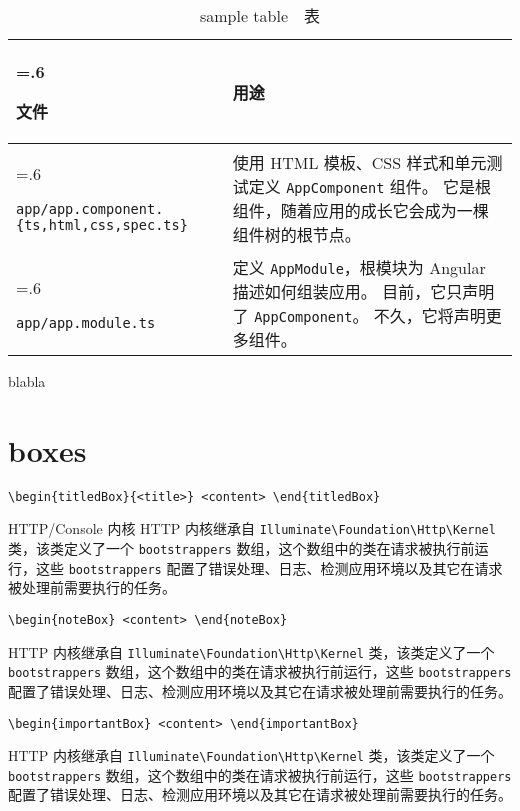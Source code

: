 \documentclass{codedump}
\begin{document}
\noindent
\begin{table}[htp]
  \caption{sample table　表 }\label{table:1}
  \begin{tabularx}{\textwidth}{>{\hsize=.6\hsize\raggedright\arraybackslash}X>{\raggedright\arraybackslash}X}\toprule
    \bfseries{文件} & \bfseries{用途}\\ \midrule
    \verb|app/app.component.{ts,html,css,spec.ts}| & 使用 HTML 模板、CSS 样式和单元测试定义 \verb|AppComponent| 组件。 它是根组件，随着应用的成长它会成为一棵组件树的根节点。\\
    \verb|app/app.module.ts| & 定义 \verb|AppModule|，根模块为 Angular 描述如何组装应用。 目前，它只声明了 \verb|AppComponent|。 不久，它将声明更多组件。\\ \bottomrule
  \end{tabularx}
\end{table}
blabla

\clearpage

\section{boxes}

\noindent\verb|\begin{titledBox}{<title>} <content> \end{titledBox}|

\begin{titledBox}{HTTP/Console 内核}
  HTTP 内核继承自 \verb|Illuminate\Foundation\Http\Kernel| 类，该类定义了一个 \verb|bootstrappers| 数组，这个数组中的类在请求被执行前运行，这些 \verb|bootstrappers| 配置了错误处理、日志、检测应用环境以及其它在请求被处理前需要执行的任务。
\end{titledBox}

\noindent\verb|\begin{noteBox} <content> \end{noteBox}|

\begin{noteBox}
  HTTP 内核继承自 \verb|Illuminate\Foundation\Http\Kernel| 类，该类定义了一个 \verb|bootstrappers| 数组，这个数组中的类在请求被执行前运行，这些 \verb|bootstrappers| 配置了错误处理、日志、检测应用环境以及其它在请求被处理前需要执行的任务。
\end{noteBox}

\noindent\verb|\begin{importantBox} <content> \end{importantBox}|

\begin{importantBox}
  HTTP 内核继承自 \verb|Illuminate\Foundation\Http\Kernel| 类，该类定义了一个 \verb|bootstrappers| 数组，这个数组中的类在请求被执行前运行，这些 \verb|bootstrappers| 配置了错误处理、日志、检测应用环境以及其它在请求被处理前需要执行的任务。
\end{importantBox}
\end{document}
